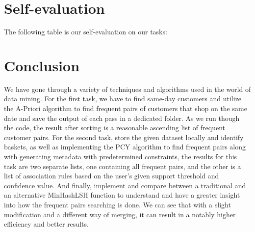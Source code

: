 \documentclass[conference]{IEEEtran}
\begin{document}
    \section{Self-evaluation}
    \label{sec:self-evaluation}

    The following table is our self-evaluation on our tasks:

    \begin{table}[h]
        \centering
        \caption{Self-evaluation}
        \setlength{\tabcolsep}{2pt} %
        \renewcommand{\arraystretch}{1} %
        \label{tab:self-evaluation}
    \end{table}

    \section{Conclusion}
    \label{sec:conclusion}
    We have gone through a variety of techniques and algorithms used in the world of data mining.
    For the first task, we have to find same-day customers and utilize the A-Priori algorithm to find frequent pairs of customers that shop on the same date and save the output of each pass in a dedicated folder.
    As we run though the code, the result after sorting is a reasonable ascending list of frequent customer pairs.
    For the second task, store the given dataset locally and identify baskets, as well as implementing the PCY algorithm to find frequent pairs along with generating metadata with predetermined constraints, the results for this task are two separate lists, one containing all frequent pairs, and the other is a list of association rules based on the user's given support threshold and confidence value.
    And finally, implement and compare between a traditional and an alternative MinHashLSH function to understand and have a greater insight into how the frequent pairs searching is done.
    We can see that with a slight modification and a different way of merging, it can result in a notably higher efficiency and better results.
\end{document}
